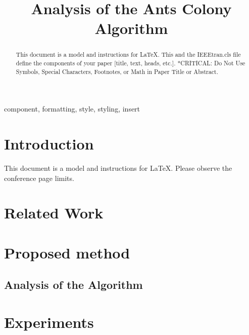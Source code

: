 \documentclass[conference]{IEEEtran}
\begin{document}
\title{Analysis of the Ants Colony Algorithm\\
}

\author{
\and
{}
}

\maketitle

\begin{abstract}
This document is a model and instructions for \LaTeX.
This and the IEEEtran.cls file define the components of your paper [title, text, heads, etc.]. *CRITICAL: Do Not Use Symbols, Special Characters, Footnotes, 
or Math in Paper Title or Abstract.
\end{abstract}

\begin{IEEEkeywords}
component, formatting, style, styling, insert
\end{IEEEkeywords}

\section{Introduction}
This document is a model and instructions for \LaTeX.
Please observe the conference page limits. 

\section{Related Work}
\section{Proposed method}
\subsection{Analysis of the Algorithm}
\section{Experiments}
\end{document}
